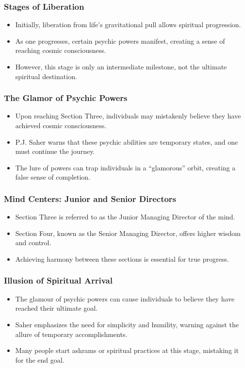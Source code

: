\begin{frame}[fragile]\frametitle{Stages of Liberation}
    \begin{itemize}
        \item Initially, liberation from life’s gravitational pull allows spiritual progression.
        \item As one progresses, certain psychic powers manifest, creating a sense of reaching cosmic consciousness.
        \item However, this stage is only an intermediate milestone, not the ultimate spiritual destination.
    \end{itemize}
\end{frame}

\begin{frame}[fragile]\frametitle{The Glamor of Psychic Powers}
    \begin{itemize}
        \item Upon reaching Section Three, individuals may mistakenly believe they have achieved cosmic consciousness.
        \item P.J. Saher warns that these psychic abilities are temporary states, and one must continue the journey.
        \item The lure of powers can trap individuals in a “glamorous” orbit, creating a false sense of completion.
    \end{itemize}
\end{frame}

\begin{frame}[fragile]\frametitle{Mind Centers: Junior and Senior Directors}
    \begin{itemize}
        \item Section Three is referred to as the Junior Managing Director of the mind.
        \item Section Four, known as the Senior Managing Director, offers higher wisdom and control.
        \item Achieving harmony between these sections is essential for true progress.
    \end{itemize}
\end{frame}

\begin{frame}[fragile]\frametitle{Illusion of Spiritual Arrival}
    \begin{itemize}
        \item The glamour of psychic powers can cause individuals to believe they have reached their ultimate goal.
        \item Saher emphasizes the need for simplicity and humility, warning against the allure of temporary accomplishments.
        \item Many people start ashrams or spiritual practices at this stage, mistaking it for the end goal.
    \end{itemize}
\end{frame}

